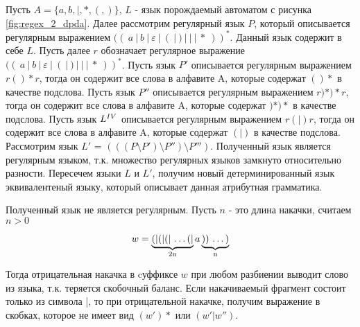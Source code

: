 \documentclass[a4paper, 14pt]{article}
\begin{document}
Пусть $A = \{a, b, |, *, (, )\}$, $L$ - язык порождаемый автоматом с рисунка \ref{fig:regex_2_dpda}. Далее рассмотрим регулярный язык $P$, который описывается регулярным выражением $((\ a \ | \ b \ | \ \varepsilon \ | \ ( \ | \ ) \ | \ \textbf{|} \ | \ * \ ))^*$. Данный язык содержит в себе $L$. Пусть далее $r$ обозначает регулярное выражение $((\ a \ | \ b \ | \ \varepsilon \ | \ ( \ | \ ) \ | \ \textbf{|} \ | \ * \ ))^*$.  Пусть язык $P'$ описывается регулярным выражением $r(){*}r$, тогда он содержит все слова в алфавите A, которые содержат $(){*}$ в качестве подслова. Пусть язык $P''$ описывается регулярным выражением $r){*}){*}r$, тогда он содержит все слова в алфавите A, которые содержат $){*}){*}$ в качестве подслова. Пусть язык $L^{\MakeUppercase{\romannumeral 4}}$ описывается регулярным выражением $r(|)r$, тогда он содержит все слова в алфавите A, которые содержат $(|)$ в качестве подслова. Рассмотрим язык $L'$ = $(((P \setminus P') \setminus P'') \setminus P''')$. Полученный язык является регулярным языком, т.к. множество регулярных языков замкнуто относительно разности. Пересечем языки $L$ и $L'$, получим новый детерминированный язык эквивалентеный языку, который описывает данная атрибутная грамматика.
  
Полученный язык не является регулярным. Пусть $n$ - это длина накачки, считаем $n > 0$

$$
  w =  \underbrace{\text{(|(|(| \dots(|}}_{\text{2n}} a \underbrace{\text{)) \dots)}}_{\text{n}}
$$

Тогда отрицательная накачка в cуффиксе $w$ при любом разбиении выводит слово из языка, т.к. теряется скобочный баланс. Если накачиваемый фрагмент состоит только из символа |, то при отрицательной накачке, получим выражение в скобках, которое не имеет вид $(w')*$ или $(w'|w'')$.
\end{document}

